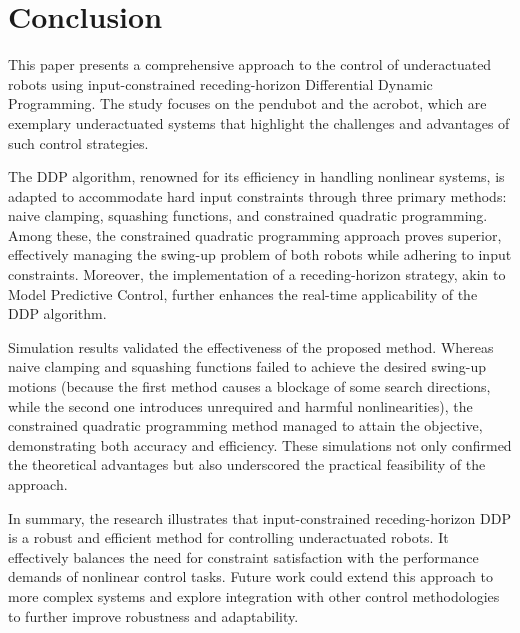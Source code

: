 \section{Conclusion}

This paper presents a comprehensive approach to the control of underactuated robots using input-constrained receding-horizon Differential Dynamic Programming. The study focuses on the pendubot and the acrobot, which are exemplary underactuated systems that highlight the challenges and advantages of such control strategies.

The DDP algorithm, renowned for its efficiency in handling nonlinear systems, is adapted to accommodate hard input constraints through three primary methods: naive clamping, squashing functions, and constrained quadratic programming. Among these, the constrained quadratic programming approach proves superior, effectively managing the swing-up problem of both robots while adhering to input constraints. Moreover, the implementation of a receding-horizon strategy, akin to Model Predictive Control, further enhances the real-time applicability of the DDP algorithm. 

Simulation results validated the effectiveness of the proposed method. Whereas naive clamping and squashing functions failed to achieve the desired swing-up motions (because the first method causes a blockage of some search directions, while the second one introduces unrequired and harmful nonlinearities), the constrained quadratic programming method managed to attain the objective, demonstrating both accuracy and efficiency. These simulations not only confirmed the theoretical advantages but also underscored the practical feasibility of the approach. 

In summary, the research illustrates that input-constrained receding-horizon DDP is a robust and efficient method for controlling underactuated robots. It effectively balances the need for constraint satisfaction with the performance demands of nonlinear control tasks. Future work could extend this approach to more complex systems and explore integration with other control methodologies to further improve robustness and adaptability.
